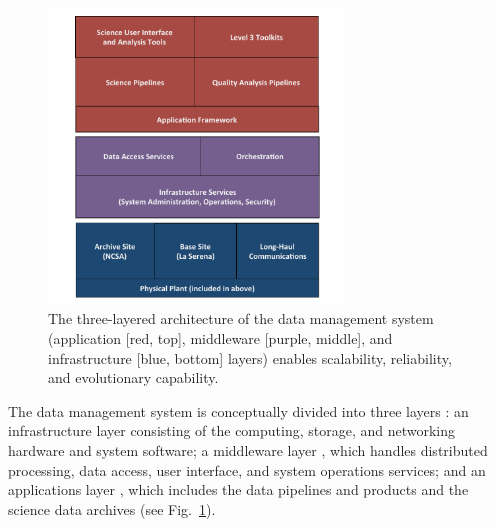 \documentclass[11pt,twoside]{article}
\begin{document}
\begin{figure}[!t]
%
%
\begin{center}
\includegraphics[width=0.7\textwidth,clip]{DMsandwich.pdf}
\end{center}
\caption{The three-layered architecture of the data management system
(application [red, top], middleware [purple, middle], and infrastructure [blue, bottom] layers) enables scalability, reliability, and evolutionary capability.}
\label{Fig:DM1}
\end{figure}

The data management system is conceptually divided into three layers
\citep{LDM-148}: an infrastructure layer \citep{LDM-129} consisting of the computing, storage, and
networking hardware and system software; a middleware layer \citep{LDM-152}, which
handles distributed processing, data access, user interface, and
system operations services; and an applications layer
\citep{LDM-151,LDM-135,LDM-131}, which includes
the data pipelines and products and the science data archives (see
Fig.~\ref{Fig:DM1}).
\end{document}
